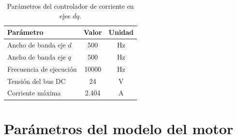 \begin{table}[htbp]
    \centering
    \caption{Parámetros del controlador de corriente en ejes $dq$.}
    \label{tab:parametros_control_corriente}
    \begin{tabular}{lcc}
        \hline
        \textbf{Parámetro} & \textbf{Valor} & \textbf{Unidad} \\
        \hline
        Ancho de banda eje $d$ & 500 & Hz \\
        Ancho de banda eje $q$ & 500 & Hz \\
        Frecuencia de ejecución & 10000 & Hz \\
        Tensión del bus DC & 24 & V \\
        Corriente máxima & 2.404 & A \\
        \hline
    \end{tabular}
\end{table}

\section{Parámetros del modelo del motor}


